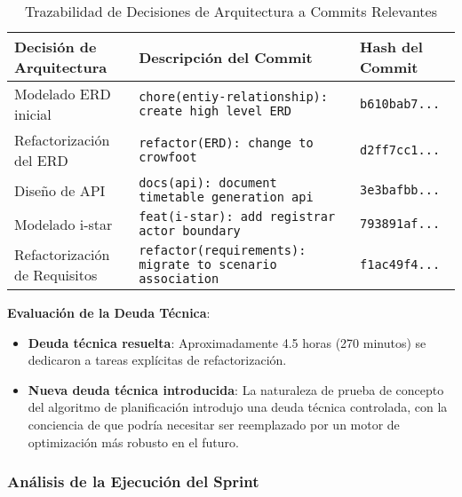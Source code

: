 \begin{table}[H]
    \caption{Trazabilidad de Decisiones de Arquitectura a Commits Relevantes}
    \label{tab:sprint-4-commit-traceability}
    \begin{tabularx}{\textwidth}{@{}lXl@{}}
        \toprule
        \textbf{Decisión de Arquitectura} & \textbf{Descripción del Commit} & \textbf{Hash del Commit} \\
        \midrule
        Modelado ERD inicial & \texttt{chore(entiy-relationship): create high level ERD} & \texttt{b610bab7...} \\
        Refactorización del ERD & \texttt{refactor(ERD): change to crowfoot} & \texttt{d2ff7cc1...} \\
        Diseño de API & \texttt{docs(api): document timetable generation api} & \texttt{3e3bafbb...} \\
        Modelado i-star & \texttt{feat(i-star): add registrar actor boundary} & \texttt{793891af...} \\
        Refactorización de Requisitos & \texttt{refactor(requirements): migrate to scenario association} & \texttt{f1ac49f4...} \\
        \bottomrule
    \end{tabularx}
\end{table}

\textbf{Evaluación de la Deuda Técnica}:
\begin{itemize}
    \item \textbf{Deuda técnica resuelta}: Aproximadamente 4.5 horas (270 minutos) se dedicaron a tareas explícitas de refactorización.
    \item \textbf{Nueva deuda técnica introducida}: La naturaleza de prueba de concepto del algoritmo de planificación introdujo una deuda técnica controlada, con la conciencia de que podría necesitar ser reemplazado por un motor de optimización más robusto en el futuro.
\end{itemize}

\subsubsection{Análisis de la Ejecución del Sprint}


